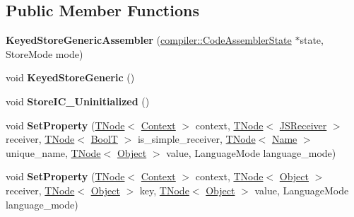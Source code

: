 \subsection*{Public Member Functions}
\begin{DoxyCompactItemize}
\item 
\mbox{\label{classv8_1_1internal_1_1KeyedStoreGenericAssembler_a8c7161e2c41c5adc2dd71f3bd3c50d68}} 
{\bfseries Keyed\+Store\+Generic\+Assembler} (\mbox{\hyperlink{classv8_1_1internal_1_1compiler_1_1CodeAssemblerState}{compiler\+::\+Code\+Assembler\+State}} $\ast$state, Store\+Mode mode)
\item 
\mbox{\label{classv8_1_1internal_1_1KeyedStoreGenericAssembler_a6fca9c77069f0de1943c197d2b865540}} 
void {\bfseries Keyed\+Store\+Generic} ()
\item 
\mbox{\label{classv8_1_1internal_1_1KeyedStoreGenericAssembler_a5da46363a6a0a75a4c4f94143ef0a058}} 
void {\bfseries Store\+I\+C\+\_\+\+Uninitialized} ()
\item 
\mbox{\label{classv8_1_1internal_1_1KeyedStoreGenericAssembler_aeff29c1e6093320d51c794a6659920a3}} 
void {\bfseries Set\+Property} (\mbox{\hyperlink{classv8_1_1internal_1_1compiler_1_1TNode}{T\+Node}}$<$ \mbox{\hyperlink{classv8_1_1internal_1_1Context}{Context}} $>$ context, \mbox{\hyperlink{classv8_1_1internal_1_1compiler_1_1TNode}{T\+Node}}$<$ \mbox{\hyperlink{classv8_1_1internal_1_1JSReceiver}{J\+S\+Receiver}} $>$ receiver, \mbox{\hyperlink{classv8_1_1internal_1_1compiler_1_1TNode}{T\+Node}}$<$ \mbox{\hyperlink{structv8_1_1internal_1_1BoolT}{BoolT}} $>$ is\+\_\+simple\+\_\+receiver, \mbox{\hyperlink{classv8_1_1internal_1_1compiler_1_1TNode}{T\+Node}}$<$ \mbox{\hyperlink{classv8_1_1internal_1_1Name}{Name}} $>$ unique\+\_\+name, \mbox{\hyperlink{classv8_1_1internal_1_1compiler_1_1TNode}{T\+Node}}$<$ \mbox{\hyperlink{classv8_1_1internal_1_1Object}{Object}} $>$ value, Language\+Mode language\+\_\+mode)
\item 
\mbox{\label{classv8_1_1internal_1_1KeyedStoreGenericAssembler_ac46037ce1be4ab1f0e5c71746a9c3963}} 
void {\bfseries Set\+Property} (\mbox{\hyperlink{classv8_1_1internal_1_1compiler_1_1TNode}{T\+Node}}$<$ \mbox{\hyperlink{classv8_1_1internal_1_1Context}{Context}} $>$ context, \mbox{\hyperlink{classv8_1_1internal_1_1compiler_1_1TNode}{T\+Node}}$<$ \mbox{\hyperlink{classv8_1_1internal_1_1Object}{Object}} $>$ receiver, \mbox{\hyperlink{classv8_1_1internal_1_1compiler_1_1TNode}{T\+Node}}$<$ \mbox{\hyperlink{classv8_1_1internal_1_1Object}{Object}} $>$ key, \mbox{\hyperlink{classv8_1_1internal_1_1compiler_1_1TNode}{T\+Node}}$<$ \mbox{\hyperlink{classv8_1_1internal_1_1Object}{Object}} $>$ value, Language\+Mode language\+\_\+mode)
\end{DoxyCompactItemize}
